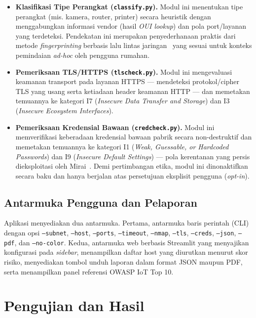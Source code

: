 \documentclass[conference]{IEEEtran}
\begin{document}
\begin{itemize}
    \item \textbf{Klasifikasi Tipe Perangkat (\texttt{classify.py}).} Modul ini menentukan tipe perangkat (mis. kamera, router, printer) secara heuristik dengan menggabungkan informasi vendor (hasil \textit{OUI lookup}) dan pola port/layanan yang terdeteksi. Pendekatan ini merupakan penyederhanaan praktis dari metode \textit{fingerprinting} berbasis lalu lintas jaringan\ \cite{sivanathan2019} yang sesuai untuk konteks pemindaian \textit{ad-hoc} oleh pengguna rumahan.
    \item \textbf{Pemeriksaan TLS/HTTPS (\texttt{tlscheck.py}).} Modul ini mengevaluasi keamanan transport pada layanan HTTPS --- mendeteksi protokol/cipher TLS yang usang serta ketiadaan header keamanan HTTP --- dan memetakan temuannya ke kategori I7 (\textit{Insecure Data Transfer and Storage}) dan I3 (\textit{Insecure Ecosystem Interfaces}).
    \item \textbf{Pemeriksaan Kredensial Bawaan (\texttt{credcheck.py}).} Modul ini memverifikasi keberadaan kredensial bawaan pabrik secara non-destruktif dan memetakan temuannya ke kategori I1 (\textit{Weak, Guessable, or Hardcoded Passwords}) dan I9 (\textit{Insecure Default Settings}) --- pola kerentanan yang persis dieksploitasi oleh Mirai\ \cite{antonakakis2017}. Demi pertimbangan etika, modul ini dinonaktifkan secara baku dan hanya berjalan atas persetujuan eksplisit pengguna (\textit{opt-in}).
\end{itemize}

\subsection{Antarmuka Pengguna dan Pelaporan}

Aplikasi menyediakan dua antarmuka. Pertama, antarmuka baris perintah (CLI) dengan opsi \texttt{--subnet}, \texttt{--host}, \texttt{--ports}, \texttt{--timeout}, \texttt{--nmap}, \texttt{--tls}, \texttt{--creds}, \texttt{--json}, \texttt{--pdf}, dan \texttt{--no-color}. Kedua, antarmuka web berbasis Streamlit yang menyajikan konfigurasi pada \textit{sidebar}, menampilkan daftar host yang diurutkan menurut skor risiko, menyediakan tombol unduh laporan dalam format JSON maupun PDF, serta menampilkan panel referensi OWASP IoT Top 10.

\section{Pengujian dan Hasil}
\end{document}
